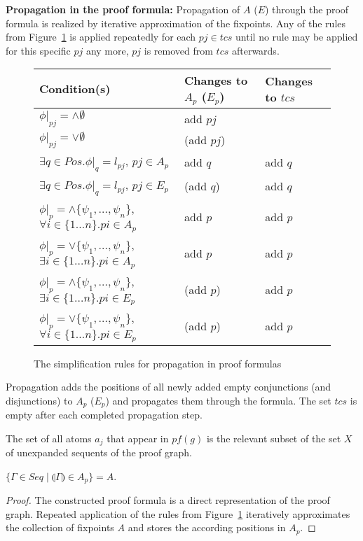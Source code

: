 \documentclass{llncs}
\newcommand{\ind}[1]{\llparenthesis #1 \rrparenthesis}
\begin{document}
\noindent\textbf{Propagation in the proof formula:}
Propagation of $A$ ($E$) through the proof formula is realized by iterative approximation of the
fixpoints. 
Any of the rules from Figure~\ref{fig:propagation} is applied repeatedly for each $pj\in tcs$ until
no rule may be applied for this specific $pj$ any more, $pj$ is removed from $tcs$ afterwards.
\begin{footnotesize}
\begin{figure}[!h]
  \begin{center}
\begin{tabular}{| l | l | l |}
\hline
Condition(s) & Changes to $A_p$ ($E_p$) & Changes to $tcs$\\
\hline
$\phi|_{pj}=\wedge\emptyset$ & add $pj$&\\
\hline
$\phi|_{pj}=\vee\emptyset$ & (add $pj$)&\\
\hline
$\exists q\in Pos.\phi|_{q}=l_{pj}$, $pj\in A_p$ & add $q$ & add $q$\\
\hline
$\exists q\in Pos.\phi|_{q}=l_{pj}$, $pj\in E_p$ & (add $q$) & add $q$\\
\hline
$\phi|_{p}=\wedge\{\psi_1,\ldots,\psi_n\}$, $\forall i\in\{1\ldots n\}. pi\in A_p$ & add $p$ & add $p$\\
\hline
$\phi|_{p}=\vee\{\psi_1,\ldots,\psi_n\}$, $\exists i\in\{1\ldots n\}. pi\in A_p$ & add $p$ & add $p$\\
\hline
$\phi|_{p}=\wedge\{\psi_1,\ldots,\psi_n\}$, $\exists i\in\{1\ldots n\}. pi\in E_p$ & (add $p$) & add $p$\\
\hline
$\phi|_{p}=\vee\{\psi_1,\ldots,\psi_n\}$, $\forall i\in\{1\ldots n\}. pi\in E_p$ & (add $p$) & add $p$\\
\hline
 \end{tabular}
  \end{center}
  \caption{The simplification rules for propagation in proof formulas}
  \label{fig:propagation}
\end{figure}
\end{footnotesize}

Propagation adds the positions of all newly added empty conjunctions (and disjunctions) to
$A_p$ ($E_p$) and propagates them through the formula. The set $tcs$ is empty after each
completed propagation step.

The set of all atoms $a_j$ that appear in $pf(g)$ is the relevant subset of the set $X$ of
unexpanded sequents of the proof graph.

\begin{lemma}
$\{\Gamma\in Seq\mid \ind{\Gamma}\in A_p\} = A$.

\begin{proof}
The constructed proof formula is a direct representation of the proof graph. 
Repeated application of the rules from Figure~\ref{fig:propagation} iteratively approximates the
collection of fixpoints $A$ and stores the according positions in $A_p$.
\end{proof}
\end{lemma}
\end{document}

